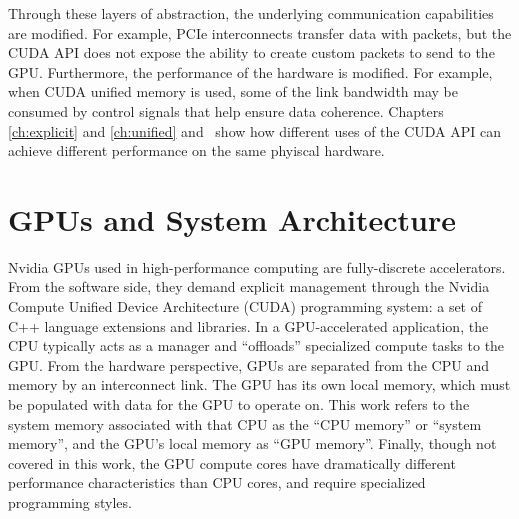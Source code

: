 Through these layers of abstraction, the underlying communication capabilities are modified.
For example, PCIe interconnects transfer data with packets, but the CUDA API does not expose the ability to create custom packets to send to the GPU.
Furthermore, the performance of the hardware is modified.
For example, when CUDA unified memory is used, some of the link bandwidth may be consumed by control signals that help ensure data coherence.
Chapters \ref{ch:explicit} and \ref{ch:unified} and~ show how different uses of the CUDA API can achieve different performance on the same phyiscal hardware.

\section{GPUs and System Architecture}
\label{sec:gpu-sys-arch}

Nvidia GPUs used in high-performance computing are fully-discrete accelerators.
From the software side, they demand explicit management through the Nvidia Compute Unified Device Architecture (CUDA) programming system: a set of C++ language extensions and libraries.
In a GPU-accelerated application, the CPU typically acts as a manager and ``offloads'' specialized compute tasks to the GPU.
From the hardware perspective, GPUs are separated from the CPU and memory by an interconnect link.
The GPU has its own local memory, which must be populated with data for the GPU to operate on.
This work refers to the system memory associated with that CPU as the ``CPU memory'' or ``system memory'', and the GPU's local memory as ``GPU memory''.
Finally, though not covered in this work, the GPU compute cores have dramatically different performance characteristics than CPU cores, and require specialized programming styles.

